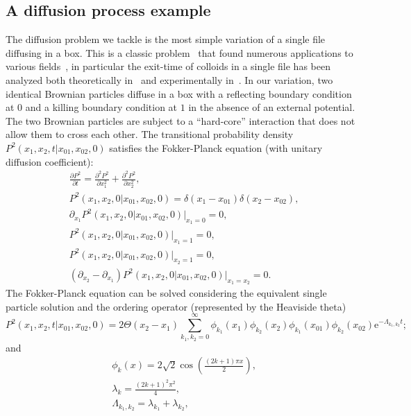 \documentclass[a4paper,11pt]{amsart}
\theoremstyle{remark}
\newcommand{\ee}[1]{\mathrm{e}^{#1}}
\newcommand{\partialO}[2]{\frac{\partial #1}{\partial #2}}
\newcommand{\partialT}[2]{\frac{\partial^2 #1}{\partial #2 ^2}}
\begin{document}
  \subsection{A diffusion process example}
  The diffusion problem we tackle is the most simple variation of a single file diffusing in a box. This is a classic problem~\cite{harris_diffusion_1965,jepsen_dynamics_1965} that found numerous applications to various fields~\cite{hummer_water_2001, li_effects_2009}, in particular the exit-time of colloids in a single file has been analyzed both theoretically in~\cite{ryabov_single-file_2013} and experimentally in~\cite{locatelli_single-file_2016}.  In our variation, two identical Brownian particles diffuse in a box with a reflecting boundary condition at $0$ and a killing boundary condition at $1$ in the absence of an external potential. The two Brownian particles are subject to a ``hard-core'' interaction that does not allow them to cross each other. The transitional probability density $P^2(x_1,x_2,t|x_{01},x_{02},0)$ satisfies the Fokker-Planck equation (with unitary diffusion coefficient):
\begin{equation}
  \label{eq:single_fileFP}
  \begin{aligned}
    &\partialO{P^2}{t}=\partialT{P^2}{x_1}+\partialT{P^2}{x_2},\\
    &P^2(x_1,x_2,0|x_{01},x_{02},0)=\delta(x_1-x_{01})\delta(x_2-x_{02}),\\
    &\partial_{x_1}P^2(x_1,x_2,0|x_{01},x_{02},0)\left.\right|_{x_1=0}=0,\\
    &P^2(x_1,x_2,0|x_{01},x_{02},0)\left.\right|_{x_1=1}=0,\\
    &P^2(x_1,x_2,0|x_{01},x_{02},0)\left.\right|_{x_2=1}=0,\\
    &(\partial_{x_2}-\partial_{x_1})P^2(x_1,x_2,0|x_{01},x_{02},0)\left.\right|_{x_1=x_2}=0.
  \end{aligned}
\end{equation}
The Fokker-Planck equation can be solved considering the equivalent single particle solution and the ordering operator (represented by the Heaviside theta)
\begin{equation}
  \label{eq:solution_sf_2D}
  P^2(x_1,x_2,t|x_{01},x_{02},0)=2\Theta(x_2-x_1)\sum_{k_1,k_2=0}^\infty\phi_{k_1}(x_1)\phi_{k_2}(x_2)\phi_{k_1}(x_{01})\phi_{k_2}(x_{02})\ee{-\Lambda_{k_1,k_2}t};
\end{equation}
and
\begin{align}
  &\phi_{k}(x)=2\sqrt{2}\cos\left(\frac{(2k+1)\pi x}{2}\right),\\
  &\lambda_k=\frac{(2k+1)^2\pi^2}{4},\\
  &\Lambda_{k_1,k_2}=\lambda_{k_1}+\lambda_{k_2},
\end{align}
\end{document}
